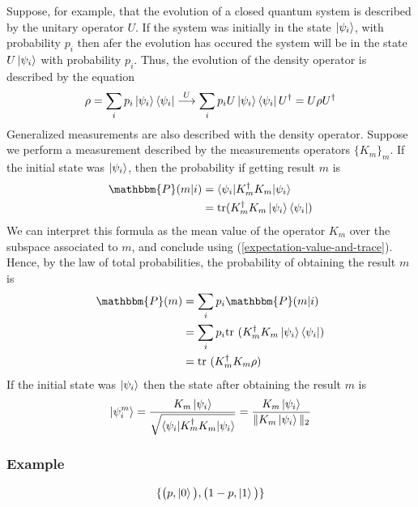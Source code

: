 \documentclass{article}
\begin{document}
Suppose, for example, that the evolution of a closed quantum system is described
by the unitary operator $U$. If the system was initially in the state
$\ket{\psi_i}$, with probability $p_i$ then afer the evolution has occured the
system will be in the state $U\ket{\psi_i}$ with probability $p_i$. Thus, the
evolution of the density operator is described by the equation
\begin{equation}
    \rho=\sum_ip_i\ket{\psi_i}\bra{\psi_i} \overset{U}{\longrightarrow}
        \sum_ip_iU\ket{\psi_i}\bra{\psi_i}U^\dagger=U\rho U^\dagger
\end{equation}
Generalized measurements are also described with the density operator. Suppose
we perform a measurement described by the measurements operators $\{K_m\}_m$. If
the initial state was $\ket{\psi_i}$, then the probability if getting result $m$
is
\begin{equation}
    \begin{aligned}
        \mathbbm{P}(m|i)
            & = \braket{\psi_i|K_m^\dagger K_m |\psi_i} \\
            & = \text{tr}(K_m^\dagger K_m\ket{\psi_i}\bra{\psi_i})
    \end{aligned}
\end{equation}
We can interpret this formula as the mean value of the operator $K_m$ over the
subspace associated to $m$, and conclude using
(\ref{expectation-value-and-trace}).\\\noindent Hence, by the law of total
probabilities, the probability of obtaining the result $m$ is
\begin{equation}
    \begin{aligned}
        \mathbbm{P}(m)
            & = \sum_i p_i \mathbbm{P}(m|i) \\
            & = \sum_i p_i \text{tr }(K_m^\dagger K_m\ket{\psi_i}\bra{\psi_i}) \\
            & = \text{tr }(K_m^\dagger K_m \rho)
    \end{aligned}
\end{equation}
If the initial state was $\ket{\psi_i}$ then the state after obtaining the
result $m$ is
\begin{equation}
    \ket{\psi_i^m}
        = \frac{K_m\ket{\psi_i}}{\sqrt{\braket{\psi_i|K_m^\dagger K_m|\psi_i}}}
        = \frac{K_m\ket{\psi_i}}{\|K_m\ket{\psi_i}\|_2}
\end{equation}

\subsubsection*{Example}
\begin{equation}
    \{\big(p, \ket{0}\big), \big(1-p, \ket{1}\big)\}
\end{equation}
\end{document}
